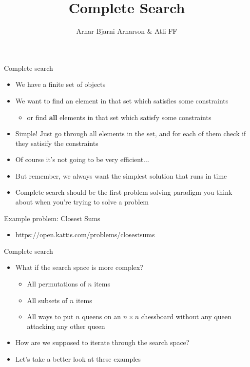 \documentclass{beamer}
\title{Complete Search}
\author{Arnar Bjarni Arnarson \& Atli FF}
\institute{\href{http://ru.is/td}{School of Computer Science} \\[2pt] \href{http://ru.is}{Reykjavík University}}
\begin{document}
\maketitle

\begin{frame}[plain]{Complete search}
    \begin{itemize}
        \item We have a finite set of objects
        \item We want to find an element in that set which satisfies some constraints
        \begin{itemize}
            \item or find \textbf{all} elements in that set which satisfy some constraints
        \end{itemize}

        \vspace{5pt}
        \item Simple! Just go through all elements in the set, and for each of them check if they satisify the constraints
        \item Of course it's not going to be very efficient...
        \item But remember, we always want the simplest solution that runs in time
        \item Complete search should be the first problem solving paradigm you think about when you're trying to solve a problem
    \end{itemize}
\end{frame}

\begin{frame}[plain]{Example problem: Closest Sums}
    \begin{itemize}
        \item https://open.kattis.com/problems/closestsums
    \end{itemize}
\end{frame}

\begin{frame}[plain]{Complete search}
    \begin{itemize}
        \item What if the search space is more complex?
            \begin{itemize}
                \item All permutations of $n$ items
                \item All subsets of $n$ items
                \item All ways to put $n$ queens on an $n\times n$ chessboard without any queen attacking any other queen
            \end{itemize}
        \item How are we supposed to iterate through the search space?
        \item Let's take a better look at these examples
    \end{itemize}
\end{frame}
\end{document}
